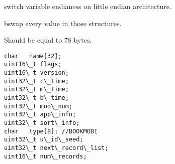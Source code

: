 \documentclass[letterpaper,10pt,english]{sphinxmanual}
\begin{document}

\begin{fulllineitems}
\label{functions:bswap__uint32_tR}
\end{fulllineitems}


\begin{fulllineitems}
\label{functions:bswap__uint64_tR}
switch variable endianess on little endian architecture.

\end{fulllineitems}


\begin{fulllineitems}
\label{functions:unretardify_header__st_palmdoc_dbR}
\end{fulllineitems}


\begin{fulllineitems}
\label{functions:unretardify_header__st_palmdocR}
\end{fulllineitems}


\begin{fulllineitems}
\label{functions:unretardify_header__st_mobiR}
bswap every value in those structures.

\end{fulllineitems}


\begin{fulllineitems}
\label{functions:st_palmdoc_db}
Should be equal to 78 bytes.

\begin{Verbatim}[commandchars=\\\{\}]
char   name[32];
uint16\_t flags;
uint16\_t version;
uint32\_t c\_time;
uint32\_t m\_time;
uint32\_t b\_time;
uint32\_t mod\_num;
uint32\_t app\_info;
uint32\_t sort\_info;
char   type[8]; //BOOKMOBI
uint32\_t u\_id\_seed;
uint32\_t next\_record\_list;
uint16\_t num\_records;
\end{Verbatim}

\end{fulllineitems}
\end{document}
